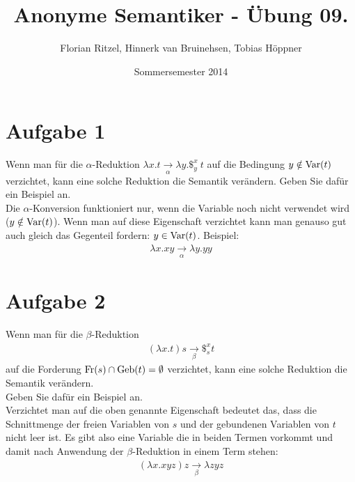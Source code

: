 \documentclass[ngerman,a4paper]{report}
\author{Florian Ritzel, Hinnerk van Bruinehsen, Tobias Höppner}
\title{Anonyme Semantiker - Übung 09. }
\date{Sommersemester 2014}
\renewcommand{\maketitle}{}
\begin{document}
\maketitle
\section*{Aufgabe 1}
Wenn man für die $\alpha$-Reduktion $\lambda x.t \xrightarrow[\alpha]{} \lambda y.\$_y^x\ t$ auf die Bedingung $y \notin \text{\lstinline!Var!}(t)$ verzichtet, kann eine solche Reduktion die Semantik verändern. Geben Sie dafür ein Beispiel an.\\

Die $\alpha$-Konversion funktioniert nur, wenn die Variable noch nicht verwendet wird ($y \notin \text{\lstinline!Var!}(t)$). Wenn man auf diese Eigenschaft verzichtet kann man genauso gut auch gleich das Gegenteil fordern: $y \in \text{\lstinline!Var!}(t)$. Beispiel:
\begin{align*}
\lambda x.xy \xrightarrow[\alpha]{}\lambda y.yy
\end{align*}

\section*{Aufgabe 2}
Wenn man für die $\beta$-Reduktion
\begin{align*}
(\lambda x.t) s \xrightarrow[\beta]{} \$_s^x t
\end{align*}
auf die Forderung $\text{\lstinline!Fr!}(s) \cap \text{\lstinline!Geb!}(t) = \emptyset$ verzichtet, kann eine solche Reduktion die Semantik verändern.\\
Geben Sie dafür ein Beispiel an.\\

Verzichtet man auf die oben genannte Eigenschaft bedeutet das, dass die Schnittmenge der freien Variablen von $s$ und der gebundenen Variablen von $t$ nicht leer ist. Es gibt also eine Variable die in beiden Termen vorkommt und damit nach Anwendung der $\beta$-Reduktion in einem Term stehen:
\begin{align*}
(\lambda x.xyz) z \xrightarrow[\beta]{} \lambda zyz
\end{align*}
\end{document}
